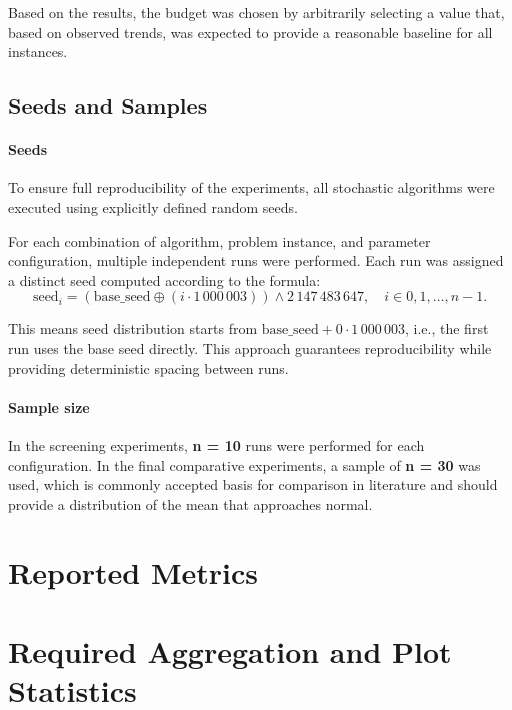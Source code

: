 \documentclass[12pt,a4paper]{report}
\begin{document}
Based on the results, the budget was chosen by arbitrarily selecting a value that, based on observed trends, was expected to provide a reasonable baseline for all instances.

\subsection{Seeds and Samples}

\paragraph{Seeds} To ensure full reproducibility of the experiments, all stochastic algorithms were executed using explicitly defined random seeds.

For each combination of algorithm, problem instance, and parameter configuration, multiple independent runs were performed. Each run was assigned a distinct seed computed according to the formula:
\[
\text{seed}_i = (\text{base\_seed} \oplus (i\cdot 1\,000\,003)) \wedge 2\,147\,483\,647, \quad i \in 0,1,\dots,n-1.
\]

This means seed distribution starts from \(\text{base\_seed} + 0\cdot 1\,000\,003\), i.e., the first run uses the base seed directly. This approach guarantees reproducibility while providing deterministic spacing between runs.

\paragraph{Sample size} In the screening experiments, \textbf{n = 10} runs were performed for each configuration. In the final comparative experiments, a sample of \textbf{n = 30} was used, which is commonly accepted basis for comparison in literature and should provide a distribution of the mean that approaches normal.

\section{Reported Metrics}

\section{Required Aggregation and Plot Statistics}
\end{document}
